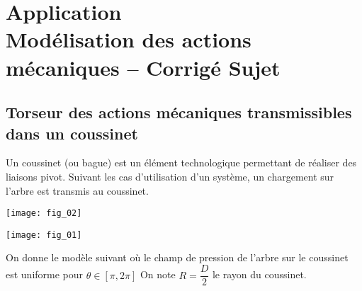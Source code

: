 \chapter*{Application  \\ 
Modélisation des actions mécaniques -- \ifprof Corrigé \else Sujet \fi}

\iflivret {} \else
\ifprof  {} \else \fi
\fi

\setcounter{question}{0}




\section*{Torseur des actions mécaniques transmissibles dans un coussinet}


\ifprof
\else
Un coussinet (ou bague) est un élément technologique permettant de réaliser des liaisons pivot. Suivant les cas d'utilisation d'un système, un chargement sur l'arbre est transmis au coussinet. 

\begin{marginfigure}
\texttt{[image: fig\_02]}
\end{marginfigure}
\fi

\begin{center}
\texttt{[image: fig\_01]}
\end{center}


On donne le modèle suivant où le champ de pression de l'arbre sur le coussinet est uniforme pour $\theta\in[\pi,2\pi]$ 
On note $R=\dfrac{D}{2}$ le rayon du coussinet. 



